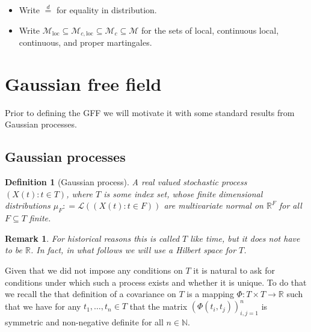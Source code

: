 \documentclass[11pt,reqno]{amsart}
\numberwithin{equation}{section}
\newtheorem{defi}[thm]{Definition}
\newtheorem{rem}[thm]{Remark}
\newcommand{\eqby}[1]{\mathrel{\stackrel{#1}{=}}}
\newcommand{\deq}{\mathrel{\mathop:}=}
\begin{document}
\begin{itemize}
	\item Write $\eqby{d}$ for equality in distribution.
	\item Write $\mathcal M_\text{loc}\subseteq\mathcal M_{c,\text{loc}}\subseteq\mathcal M_c\subseteq\mathcal M$ for the sets of local, continuous local, continuous, and proper martingales.
\end{itemize}

\newpage\section{Gaussian free field}

Prior to defining the GFF we will motivate it with some standard results from Gaussian processes.

\subsection{Gaussian processes}

\begin{defi}[Gaussian process]
	A real valued stochastic process $(X(t):t\in T)$, where $T$ is some index set, whose finite dimensional distributions $\mu_F\deq \mathcal L((X(t):t\in F))$ are multivariate normal on $\mathbb R^F$ for all $F\subseteq T$ finite.
\end{defi}

\begin{rem}
	For historical reasons this is called $T$ like time, but it does not have to be $\mathbb R$. In fact, in what follows we will use a Hilbert space for $T$.
\end{rem}

Given that we did not impose any conditions on $T$ it is natural to ask for conditions under which such a process exists and whether it is unique. To do that we recall the that definition of a covariance on $T$ is a mapping $\Phi:T\times T\rightarrow\mathbb R$ such that we have for any $t_1,\dots, t_n\in T$ that the matrix $(\Phi(t_i,t_j))_{i,j=1}^n$ is symmetric and non-negative definite for all $n\in\mathbb N$.
\end{document}
